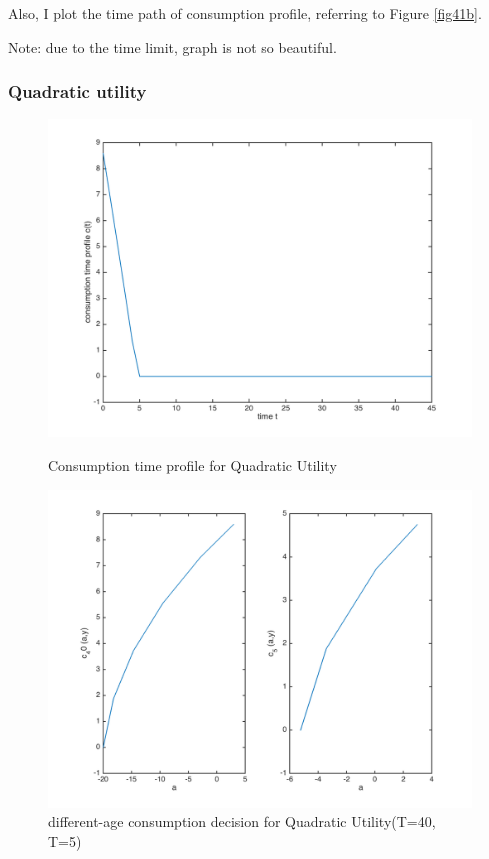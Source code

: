 \documentclass{article}[a4paper]
\begin{document}
Also, I plot the time path of consumption profile, referring to Figure \ref{fig41b}. 

Note: due to the time limit, graph is not so beautiful.

\subsubsection*{Quadratic utility}

\begin{figure}[htbp]
\centering
\begin{minipage}[t]{0.48\textwidth}
\includegraphics[width=\textwidth]{img/42a.png}
\caption{Consumption time profile for Quadratic Utility}\label{fig42a}
\end{minipage}
\begin{minipage}[t]{0.48\textwidth}
\centering
\includegraphics[width=\textwidth]{img/42b.png}
\caption{different-age consumption decision for Quadratic Utility(T=40, T=5)}\label{fig42b}
\end{minipage}
\end{figure}
\end{document}
